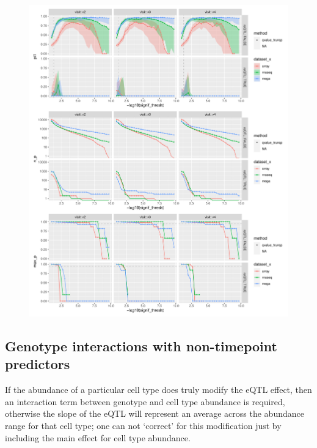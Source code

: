 \begin{figure}
    \centering
    \includegraphics[width=1.0\textwidth,page=1]{mainmatter/figures/chapter_03/compute_pi1.pi1_by_thresholds.pdf}
    \caption{}
    \label{fig:hird_eQTL_pi1vsGTExWholeBlood}
\end{figure}


\subsection{Genotype interactions with non-timepoint predictors}

If the abundance of a particular cell type does truly modify the \gls{eQTL} effect, 
then an interaction term between genotype and cell type abundance is required, 
otherwise the slope of the \gls{eQTL} will represent an average across the abundance range for that cell type;
one can not \enquote*{correct} for this modification just by including the main effect for cell type abundance.

